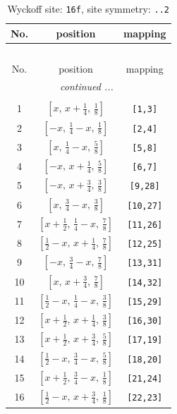 \documentclass[fleqn,8pt]{jsarticle}
\begin{document}
\renewcommand{\arraystretch}{1.2}
\begin{longtable}{ccc}
\caption{Wyckoff site: {\tt 16f}, site symmetry: {\tt ..2}}
 \\
 \hline \hline
No. & position & mapping \\ \hline \endfirsthead

\multicolumn{2}{l}{\tablename\ \thetable{}} \\
 \hline \hline
No. & position & mapping \\ \hline \endhead

 \hline \hline
\multicolumn{2}{r}{\footnotesize\it continued ...} \\ \endfoot

 \hline \hline
\multicolumn{2}{r}{} \\ \endlastfoot

1 & $\left[ x,\, x + \frac{1}{4},\, \frac{1}{8} \right]$ & {\tt [1,3]} \\ \hline
2 & $\left[ - x,\, \frac{1}{4} - x,\, \frac{1}{8} \right]$ & {\tt [2,4]} \\ \hline
3 & $\left[ x,\, \frac{1}{4} - x,\, \frac{5}{8} \right]$ & {\tt [5,8]} \\ \hline
4 & $\left[ - x,\, x + \frac{1}{4},\, \frac{5}{8} \right]$ & {\tt [6,7]} \\ \hline
5 & $\left[ - x,\, x + \frac{3}{4},\, \frac{3}{8} \right]$ & {\tt [9,28]} \\ \hline
6 & $\left[ x,\, \frac{3}{4} - x,\, \frac{3}{8} \right]$ & {\tt [10,27]} \\ \hline
7 & $\left[ x + \frac{1}{2},\, \frac{1}{4} - x,\, \frac{7}{8} \right]$ & {\tt [11,26]} \\ \hline
8 & $\left[ \frac{1}{2} - x,\, x + \frac{1}{4},\, \frac{7}{8} \right]$ & {\tt [12,25]} \\ \hline
9 & $\left[ - x,\, \frac{3}{4} - x,\, \frac{7}{8} \right]$ & {\tt [13,31]} \\ \hline
10 & $\left[ x,\, x + \frac{3}{4},\, \frac{7}{8} \right]$ & {\tt [14,32]} \\ \hline
11 & $\left[ \frac{1}{2} - x,\, \frac{1}{4} - x,\, \frac{3}{8} \right]$ & {\tt [15,29]} \\ \hline
12 & $\left[ x + \frac{1}{2},\, x + \frac{1}{4},\, \frac{3}{8} \right]$ & {\tt [16,30]} \\ \hline
13 & $\left[ x + \frac{1}{2},\, x + \frac{3}{4},\, \frac{5}{8} \right]$ & {\tt [17,19]} \\ \hline
14 & $\left[ \frac{1}{2} - x,\, \frac{3}{4} - x,\, \frac{5}{8} \right]$ & {\tt [18,20]} \\ \hline
15 & $\left[ x + \frac{1}{2},\, \frac{3}{4} - x,\, \frac{1}{8} \right]$ & {\tt [21,24]} \\ \hline
16 & $\left[ \frac{1}{2} - x,\, x + \frac{3}{4},\, \frac{1}{8} \right]$ & {\tt [22,23]} \\
\end{longtable}
\end{document}

